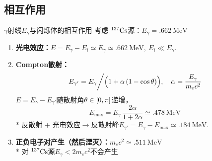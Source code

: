 \documentclass[aspectratio=169,10pt
]{beamer}
\newcommand{\csAtom}{${}^{137}\mrm{Cs}$}
\begin{document}
\subsection{相互作用}
\begin{frame}{$\gamma$射线$E_\gamma$与闪烁体的相互作用}{
	考虑 \csAtom 源：$E_\gamma = \SI{.662}{\MeV}$
}
	\begin{enumerate}
	\item \textbf{光电效应：}$
		E = E_\gamma - E_i \simeq E_\gamma
		\simeq \SI{.662}{\MeV},\ E_i\ll E_\gamma
	$. 
	\item \textbf{Compton散射：}
	\begin{equation}
		E_{\gamma'} = E_\gamma \bigg/ \pqty\Big{
			1 + \alpha\,(1 - \cos\theta)
		},\quad
		\alpha = \frac{E_\gamma}{m_e c^2}
	\end{equation}
	$E = E_\gamma - E_{\gamma'}$随散射角$\theta\in\bqty{0,\pi}$递增，
	\begin{equation}
		E_{\max} = E_\gamma\,\frac{2\alpha}{1 + 2\alpha}
		\simeq \SI{.478}{\MeV}
	\end{equation}
	{\smaller
	* 反散射 + 光电效应$\to$反散射峰$
		E_{\gamma'}
		= E_\gamma - E_{\max}
		\simeq \SI{.184}{\MeV}
	$. }
	\item \textbf{正负电子对产生（然后湮灭）：}$m_e c^2 \simeq \SI{.511}{\MeV}$
	\\[1ex]
	\smaller
	* 对 \csAtom 源$E_\gamma < 2m_e c^2$不会产生
	\end{enumerate}
\end{frame}
\end{document}
